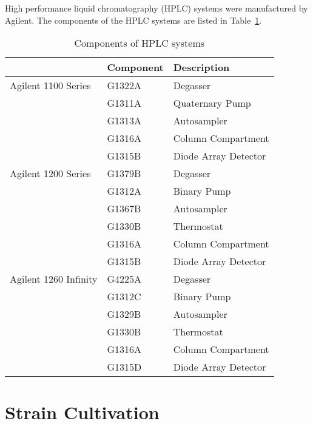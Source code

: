 	High performance liquid chromatography (HPLC) systems were manufactured by Agilent. The components of the HPLC systems are listed in Table~\ref{tab:HPLCtab}.

	\begin{table}[H]
		\caption{Components of HPLC systems}
		\label{tab:HPLCtab}
		\centering
		\begin{tabularx}{\textwidth}{XXX}
			\toprule
							& \textbf{Component}		& \textbf{Description}	\\
			\midrule
			Agilent 1100 Series		&	G1322A		&	Degasser			\\
									&	G1311A		&	Quaternary Pump		\\
									&	G1313A		&	Autosampler			\\
									&	G1316A		&	Column Compartment	\\
									&	G1315B		&	Diode Array Detector	\\
			\midrule
			Agilent 1200 Series		&	G1379B		&	Degasser			\\
									&	G1312A		&	Binary Pump			\\
									&	G1367B		&	Autosampler			\\
									&	G1330B		&	Thermostat			\\
									&	G1316A		&	Column Compartment	\\
									&	G1315B		&	Diode Array Detector	\\
			\midrule
			Agilent 1260 Infinity	&	G4225A		&	Degasser			\\
									&	G1312C		&	Binary Pump			\\
									&	G1329B		&	Autosampler			\\
									&	G1330B		&	Thermostat			\\
									&	G1316A		&	Column Compartment	\\
									&	G1315D		&	Diode Array Detector	\\
			\bottomrule
		\end{tabularx}
	\end{table}


\clearpage

\section{Strain Cultivation} %
\label{sec:strain_cultivation}

